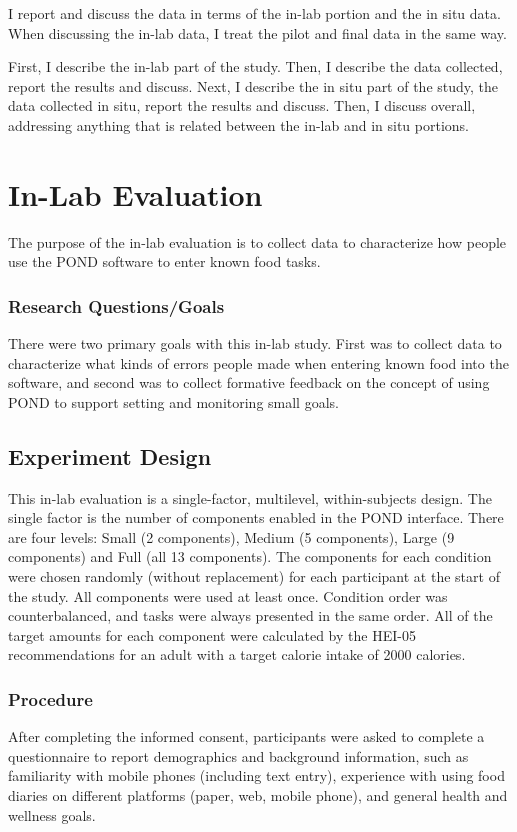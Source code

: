 I report and discuss the data in terms of the in-lab portion and the in situ data. When discussing the in-lab data, I treat the pilot and final data in the same way. 

First, I describe the in-lab part of the study. Then, I describe the data collected, report the results and discuss. Next, I describe the in situ part of the study, the data collected in situ, report the results and discuss. Then, I discuss overall, addressing anything that is related between the in-lab and in situ portions. 

\section{In-Lab Evaluation}
The purpose of the in-lab evaluation is to collect data to characterize how people use the POND software to enter known food tasks. 

\subsubsection{Research Questions/Goals}
There were two primary goals with this in-lab study. First was to collect data to characterize what kinds of errors people made when entering known food into the software, and second was to collect formative feedback on the concept of using POND to support setting and monitoring small goals. 

\subsection{Experiment Design}
This in-lab evaluation is a single-factor, multilevel, within-subjects design. The single factor is the number of components enabled in the POND interface. There are four levels: Small (2 components), Medium (5 components), Large (9 components) and Full (all 13 components). The components for each condition were chosen randomly (without replacement) for each participant at the start of the study. All components were used at least once. Condition order was counterbalanced, and tasks were always presented in the same order. All of the target amounts for each component were calculated by the HEI-05 recommendations for an adult with a target calorie intake of 2000 calories. 


\subsubsection{Procedure}
After completing the informed consent, participants were asked to complete a questionnaire to report demographics and background information, such as familiarity with mobile phones (including text entry), experience with using food diaries on different platforms (paper, web, mobile phone), and general health and wellness goals. 

